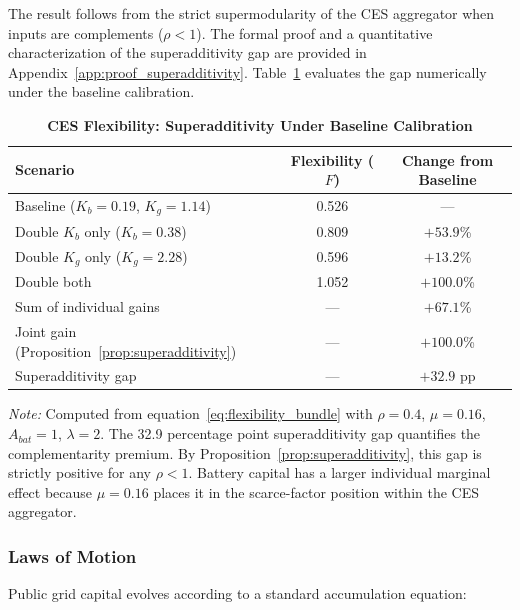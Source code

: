 \documentclass[12pt, a4paper]{article}
\begin{document}
\noindent The result follows from the strict supermodularity of the CES aggregator when inputs are complements ($\rho < 1$). The formal proof and a quantitative characterization of the superadditivity gap are provided in Appendix~\ref{app:proof_superadditivity}. Table~\ref{tab:ces_complementarity} evaluates the gap numerically under the baseline calibration.

\begin{table}[H]
    \centering
    \caption{\textbf{CES Flexibility: Superadditivity Under Baseline Calibration}}
    \label{tab:ces_complementarity}
    \renewcommand{\arraystretch}{1.3}
    \small
    \begin{tabular}{l c c}
        \toprule
        \textbf{Scenario} & \textbf{Flexibility ($F$)} & \textbf{Change from Baseline} \\
        \midrule
        Baseline ($K_b = 0.19$, $K_g = 1.14$) & 0.526 & --- \\
        Double $K_b$ only ($K_b = 0.38$) & 0.809 & $+53.9$\% \\
        Double $K_g$ only ($K_g = 2.28$) & 0.596 & $+13.2$\% \\
        Double both & 1.052 & $+100.0$\% \\
        \midrule
        Sum of individual gains & --- & $+67.1$\% \\
        Joint gain (Proposition~\ref{prop:superadditivity}) & --- & $+100.0$\% \\
        Superadditivity gap & --- & $+32.9$ pp \\
        \bottomrule
    \end{tabular}
    \vspace{0.2cm}
    \parbox{\textwidth}{\footnotesize \textit{Note:} Computed from equation~\eqref{eq:flexibility_bundle} with $\rho = 0.4$, $\mu = 0.16$, $A_{bat} = 1$, $\lambda = 2$. The 32.9 percentage point superadditivity gap quantifies the complementarity premium. By Proposition~\ref{prop:superadditivity}, this gap is strictly positive for any $\rho < 1$. Battery capital has a larger individual marginal effect because $\mu = 0.16$ places it in the scarce-factor position within the CES aggregator.}
\end{table}

\subsubsection{Laws of Motion}

Public grid capital evolves according to a standard accumulation equation:
\end{document}
